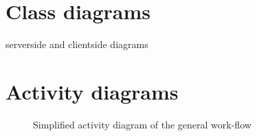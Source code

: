 \documentclass[a4paper]{article}
\begin{document}
	
	\newpage\section{Class diagrams}\label{app:cd}
	serverside and clientside diagrams
	
	\newpage\section{Activity diagrams}\label{app:ad}
	
	\begin{figure}[ht]
	\caption{Simplified activity diagram of the general work-flow}
	\centering
	\label{fig:app:ad_generalworkflow}
	\end{figure}
	
	
	
\end{document}
